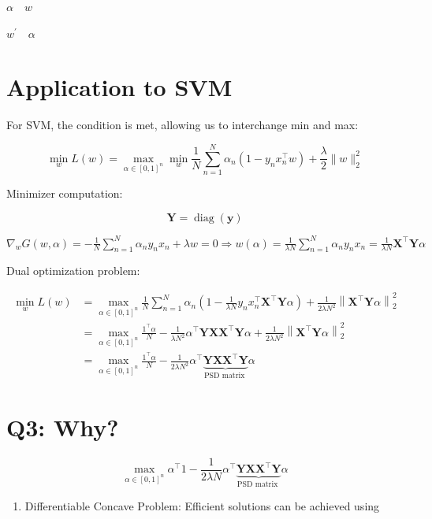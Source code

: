 \documentclass[10pt]{article}
\begin{document}
$\alpha \quad w$

$w^{\prime} \quad \alpha$

\section*{Application to SVM}
For SVM, the condition is met, allowing us to interchange min and max:

$$
\min _{w} L(w)=\max _{\alpha \in[0,1]^{n}} \min _{w} \frac{1}{N} \sum_{n=1}^{N} \alpha_{n}\left(1-y_{n} x_{n}^{\top} w\right)+\frac{\lambda}{2}\|w\|_{2}^{2}
$$

Minimizer computation:

$$
\mathbf{Y}=\operatorname{diag}(\mathbf{y})
$$

$\nabla_{w} G(w, \alpha)=-\frac{1}{N} \sum_{n=1}^{N} \alpha_{n} y_{n} x_{n}+\lambda w=0 \Longrightarrow w(\alpha)=\frac{1}{\lambda N} \sum_{n=1}^{N} \alpha_{n} y_{n} x_{n}=\frac{1}{\lambda N} \mathbf{X}^{\top} \mathbf{Y} \alpha$

Dual optimization problem:

$$
\begin{aligned}
\min _{w} L(w) & =\max _{\alpha \in[0,1]^{n}} \frac{1}{N} \sum_{n=1}^{N} \alpha_{n}\left(1-\frac{1}{\lambda N} y_{n} x_{n}^{\top} \mathbf{X}^{\top} \mathbf{Y} \alpha\right)+\frac{1}{2 \lambda N^{2}}\left\|\mathbf{X}^{\top} \mathbf{Y} \alpha\right\|_{2}^{2} \\
& =\max _{\alpha \in[0,1]^{n}} \frac{1^{\top} \alpha}{N}-\frac{1}{\lambda N^{2}} \alpha^{\top} \mathbf{Y} \mathbf{X} \mathbf{X}^{\top} \mathbf{Y} \alpha+\frac{1}{2 \lambda N^{2}}\left\|\mathbf{X}^{\top} \mathbf{Y} \alpha\right\|_{2}^{2} \\
& =\max _{\alpha \in[0,1]^{n}} \frac{1^{\top} \alpha}{N}-\frac{1}{2 \lambda N^{2}} \alpha^{\top} \underbrace{\mathbf{Y} \mathbf{X} \mathbf{X}^{\top} \mathbf{Y}}_{\text {PSD matrix }} \alpha
\end{aligned}
$$

\section*{Q3: Why?}
$$
\max _{\alpha \in[0,1]^{n}} \alpha^{\top} 1-\frac{1}{2 \lambda N} \alpha^{\top} \underbrace{\mathbf{Y X} \mathbf{X}^{\top} \mathbf{Y}}_{\text {PSD matrix }} \alpha
$$

\begin{enumerate}
  \item Differentiable Concave Problem: Efficient solutions can be achieved using
\end{enumerate}
\end{document}

